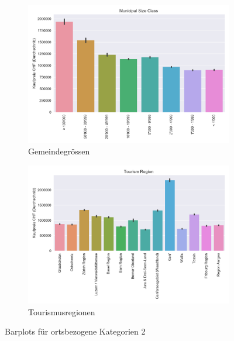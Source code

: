 \begin{figure}[h]
\begin{subfigure}{.5\textwidth}
  \includegraphics[width=\linewidth]{images/anhang/analysis/barplot_municipal_size_class_id.png}
  \caption{Gemeindegrössen}
\end{subfigure}
\begin{subfigure}{.5\textwidth}
  \centering
  \includegraphics[width=\linewidth]{images/anhang/analysis/barplot_tourism_region_id.png}
  \caption{Tourismusregionen}
\end{subfigure}
\caption{Barplots für ortsbezogene Kategorien 2}
\end{figure}

